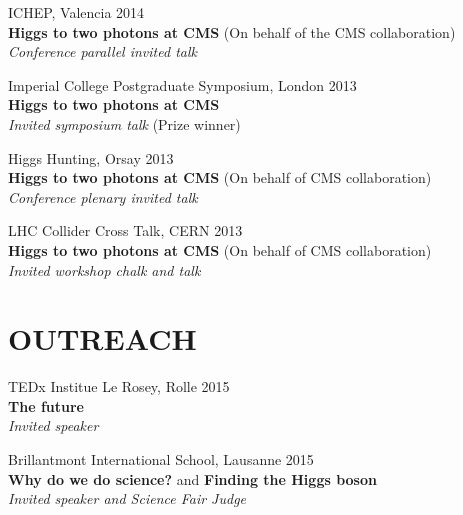 \documentclass[margin, 10pt]{res} %
\begin{document}
\begin{resume}
ICHEP, Valencia 2014 \\
\textbf{Higgs to two photons at CMS} (On behalf of the CMS collaboration) \\
\textit{Conference parallel invited talk}


Imperial College Postgraduate Symposium, London 2013\\
\textbf{Higgs to two photons at CMS} \\
\textit{Invited symposium talk} (Prize winner)

Higgs Hunting, Orsay 2013 \\
\textbf{Higgs to two photons at CMS} (On behalf of CMS collaboration) \\
\textit{Conference plenary invited talk}

LHC Collider Cross Talk, CERN 2013 \\
\textbf{Higgs to two photons at CMS} (On behalf of CMS collaboration) \\
\textit{Invited workshop chalk and talk}




\section{OUTREACH}

TEDx Institue Le Rosey, Rolle 2015 \\
\textbf{The future} \\
\textit{Invited speaker}

Brillantmont International School, Lausanne 2015 \\
\textbf{Why do we do science?} and \textbf{Finding the Higgs boson} \\
\textit{Invited speaker and Science Fair Judge}


\end{resume}
\end{document}
